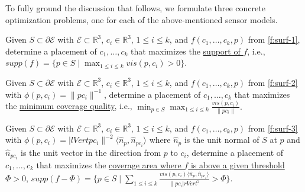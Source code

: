 To fully ground the discussion that follows, we formulate three concrete optimization problems, one for each of the above-mentioned sensor models. 

\begin{problem}\label{p:surf-1} 
    Given $S \subset \partial \mathcal E$ with $\mathcal E \subset \mathbb R^{3}$, $c_i \in \mathbb R^3$, 
    $1 \le i \le k$, and $f(c_1, \ldots, c_k, p)$ from \eqref{f:surf-1}, 
    determine a placement of $c_1, \ldots, c_k$ that maximizes the \ul{support of $f$}, i.e., 
    $supp(f) = \{p \in S \mid \max_{1\le i \le k}vis(p, c_i) >0\}.$  
\end{problem}

\begin{problem}\label{p:surf-2} 
    Given $S \subset \partial \mathcal E$ with $\mathcal E \subset \mathbb R^{3}$, $c_i \in \mathbb R^3$, 
    $1 \le i \le k$, and $f(c_1, \ldots, c_k, p)$ from \eqref{f:surf-2} with $\phi(p, c_i) = \lVert pc_i\rVert^{-1}$, 
    determine a placement of $c_1, \ldots, c_k$ that maximizes the \ul{minimum coverage quality}, i.e., 
    $\min_{p \in S} \max_{1\le i \le k} \frac{vis(p, c_i)}{ \lVert pc_i\rVert}.$
\end{problem}

\begin{problem}\label{p:surf-3} 
    Given $S \subset \partial \mathcal E$ with $\mathcal E \subset \mathbb R^{3}$, 
    $c_i \in \mathbb R^3$, $1 \le i \le k$, and $f(c_1, \ldots, c_k, p)$ from \eqref{f:surf-3} with $\phi(p, c_i) = |lVert pc_i\rVert^{-2}\langle \hat{n}_p, \hat{n}_{pc_i} \rangle$ where $\hat{n}_p$ is the unit normal of $S$ at $p$ and $\hat{n}_{pc_i}$ is the unit vector in the direction from $p$ to $c_i$, 
    determine a placement of $c_1, \ldots, c_k$ that maximizes the \ul{coverage area where $f$ is above a given threshold} $\Phi > 0$,
    $supp(f - \Phi) = \{p \in S \mid \sum_{1\le i \le k} \frac{vis(p, c_i)\langle \hat{n}_p, \hat{n}_{pc_i} \rangle}{ \lVert pc_i|rVert ^2} > \Phi \}.$  
\end{problem}


